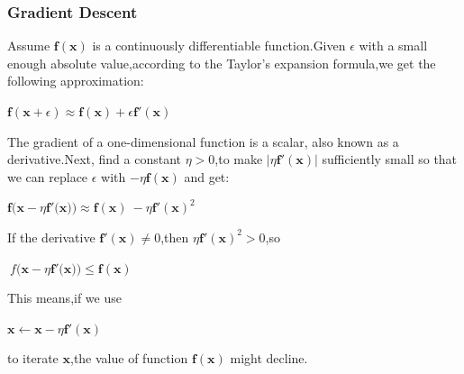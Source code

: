 \documentclass[cjk]{beamer}
\begin{document}
\begin{CJK*}{GBK}{kai}
\begin{frame}
\frametitle{Gradient Descent}
Assume $\mathbf{f}(\mathbf{x})$ is a continuously differentiable function.Given $\epsilon$ with a small enough absolute value,according to the Taylor's expansion formula,we get the following approximation:\\
\centerline{$\mathbf{f}(\mathbf{x}+\epsilon)\approx\mathbf{f}(\mathbf{x})+\epsilon\mathbf{f}'(\mathbf{x})$}
The gradient of a one-dimensional function is a scalar, also known as a derivative.Next, find a constant
$\eta>0$,to make $|\eta\mathbf{f}'(\mathbf{x})|$ sufficiently small so that we can replace $\epsilon$ with 
$-\eta\mathbf{f}(\mathbf{x})$ and get:\\
\centerline{$\mathbf{f}\Big(\mathbf{x}-\eta\mathbf{f}'\big(\mathbf{x}\big)\Big)\approx\mathbf{f}(\mathbf{x})\
-\eta\mathbf{f}'(\mathbf{x})^2$}
If the derivative $\mathbf{f}'(\mathbf{x})\neq0$,then $\eta\mathbf{f}'(\mathbf{x})^2>0$,so\\
\centerline{$\mathbf\
{f}\Big(\mathbf{x}-\eta\mathbf{f}'\big(\mathbf{x}\big)\Big)\leq\mathbf{f}(\mathbf{x})$}
This means,if we use\\
\centerline{$\mathbf{x}\leftarrow\mathbf{x}-\eta\mathbf{f}'(\mathbf{x})$}
to iterate $\mathbf{x}$,the value of function $\mathbf{f}(\mathbf{x})$ might decline.
\end{frame}


\end{CJK*}
\end{document}
